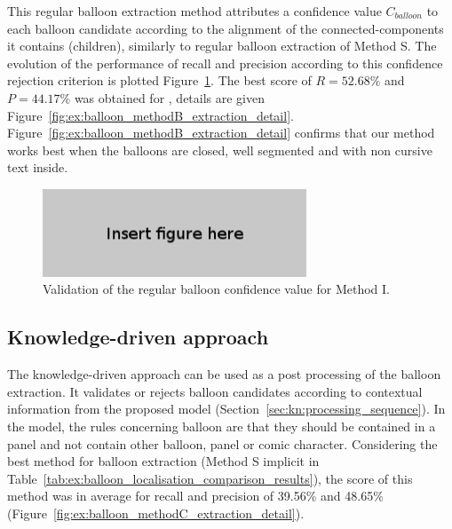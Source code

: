 This regular balloon extraction method attributes a confidence value $C_{balloon}$ to each balloon candidate according to the alignment of the connected-components it contains (children), similarly to regular balloon extraction of Method S.
The evolution of the performance of recall and precision according to this confidence rejection criterion is plotted Figure~\ref{fig:ex:validation_confidence_balloon_methodB_regular}.
The best score of $R=52.68\%$ and $P=44.17\%$ was obtained for , details are given Figure~\ref{fig:ex:balloon_methodB_extraction_detail}.
Figure~\ref{fig:ex:balloon_methodB_extraction_detail} confirms that our method works best when the balloons are closed, well segmented and with non cursive text inside.

\begin{figure}[h]
  \centering
 \includegraphics[width=0.7\textwidth]{figure_here.png}
 \caption{Validation of the regular balloon confidence value for Method I.
 }
 \label{fig:ex:validation_confidence_balloon_methodB_regular}
\end{figure}




\subsection{Knowledge-driven approach} %

The knowledge-driven approach can be used as a post processing of the balloon extraction.
It validates or rejects balloon candidates according to contextual information from the proposed model (Section~\ref{sec:kn:processing_sequence}).
In the model, the rules concerning balloon are that they should be contained in a panel and not contain other balloon, panel or comic character.
Considering the best method for balloon extraction (Method S implicit in Table~\ref{tab:ex:balloon_localisation_comparison_results}), the score of this method was in average for recall and precision of 39.56\% and 48.65\% (Figure~\ref{fig:ex:balloon_methodC_extraction_detail}).

